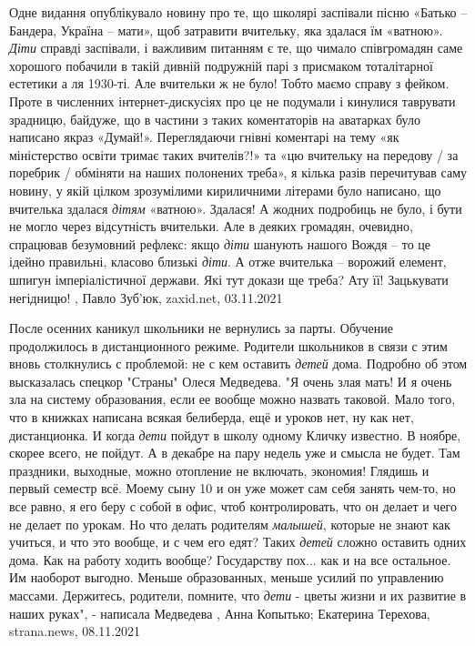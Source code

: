 Одне видання опублікувало новину про те, що школярі заспівали пісню «Батько –
Бандера, Україна – мати», щоб затравити вчительку, яка здалася їм «ватною».
\emph{Діти} справді заспівали, і важливим питанням є те, що чимало співгромадян
саме хорошого побачили в такій дивній подружній парі з присмаком тоталітарної
естетики а ля 1930-ті. Але вчительки ж не було! Тобто маємо справу з фейком.
Проте в численних інтернет-дискусіях про це не подумали і кинулися таврувати
зрадницю, байдуже, що в частини з таких коментаторів на аватарках було написано
якраз «Думай!».  Переглядаючи гнівні коментарі на тему «як міністерство освіти
тримає таких вчителів?!» та «цю вчительку на передову / за поребрик / обміняти
на наших полонених треба», я кілька разів перечитував саму новину, у якій
цілком зрозумілими кириличними літерами було написано, що вчителька здалася
\emph{дітям} «ватною». Здалася! А жодних подробиць не було, і бути не могло
через відсутність вчительки. Але в деяких громадян, очевидно, спрацював
безумовний рефлекс: якщо \emph{діти} шанують нашого Вождя – то це ідейно
правильні, класово близькі \emph{діти}. А отже вчителька – ворожий елемент,
шпигун імперіалістичної держави. Які тут докази ще треба? Ату її! Зацькувати
негідницю!
, Павло Зуб'юк, zaxid.net, 03.11.2021

После осенних каникул школьники не вернулись за парты. Обучение продолжилось в
дистанционного режиме.  Родители школьников в связи с этим вновь столкнулись с
проблемой: не с кем оставить \emph{детей} дома. Подробно об этом высказалась спецкор
"Страны" Олеся Медведева.  "Я очень злая мать! И я очень зла на систему
образования, если ее вообще можно назвать таковой. Мало того, что в книжках
написана всякая белиберда, ещё и уроков нет, ну как нет, дистанционка. И когда
\emph{дети} пойдут в школу одному Кличку известно. В ноябре, скорее всего, не пойдут.
А в декабре на пару недель уже и смысла не будет. Там праздники, выходные,
можно отопление не включать, экономия! Глядишь и первый семестр всё.  Моему
сыну 10 и он уже может сам себя занять чем-то, но все равно, я его беру с собой
в офис, чтоб контролировать, что он делает и чего не делает по урокам.  Но что
делать родителям \emph{малышей}, которые не знают как учиться, и что это вообще, и с
чем его едят? Таких \emph{детей} сложно оставить одних дома. Как на работу ходить
вообще?  Государству пох... как и на все остальное.  Им наоборот выгодно.
Меньше образованных, меньше усилий по управлению массами.  Держитесь, родители,
помните, что \emph{дети} - цветы жизни и их развитие в наших руках", - написала
Медведева
, 
Анна Копытько; Екатерина Терехова, strana.news, 08.11.2021
  
